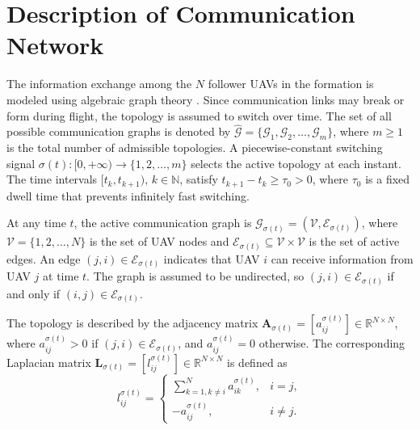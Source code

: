 
\section{Description of Communication Network}
\label{sec5:graph_theory}

The information exchange among the $N$ follower UAVs in the formation is modeled
using algebraic graph theory \cite{graphtheory1, graphtheory2}. Since communication
links may break or form during flight, the topology is assumed to switch over time.
The set of all possible communication graphs is denoted by
$\hat{\mathcal{G}} = \{\mathcal{G}_1, \mathcal{G}_2, \ldots, \mathcal{G}_m\}$, where
$m \geq 1$ is the total number of admissible topologies. A piecewise-constant
switching signal $\sigma(t): [0, +\infty) \rightarrow \{1, 2, \ldots, m\}$ selects the
active topology at each instant. The time intervals $[t_k, t_{k+1})$, $k \in \mathbb{N}$,
satisfy $t_{k+1} - t_k \geq \tau_0 > 0$, where $\tau_0$ is a fixed dwell time that
prevents infinitely fast switching.

At any time $t$, the active communication graph is
$\mathcal{G}_{\sigma(t)} = (\mathcal{V}, \mathcal{E}_{\sigma(t)})$, where
$\mathcal{V} = \{1, 2, \ldots, N\}$ is the set of UAV nodes and
$\mathcal{E}_{\sigma(t)} \subseteq \mathcal{V} \times \mathcal{V}$ is the set of active
edges. An edge $(j, i) \in \mathcal{E}_{\sigma(t)}$ indicates that UAV $i$ can receive
information from UAV $j$ at time $t$. The graph is assumed to be undirected, so
$(j, i) \in \mathcal{E}_{\sigma(t)}$ if and only if $(i, j) \in \mathcal{E}_{\sigma(t)}$.

The topology is described by the adjacency matrix
$\mathbf{A}_{\sigma(t)} = [a_{ij}^{\sigma(t)}] \in \mathbb{R}^{N \times N}$, where
$a_{ij}^{\sigma(t)} > 0$ if $(j, i) \in \mathcal{E}_{\sigma(t)}$, and
$a_{ij}^{\sigma(t)} = 0$ otherwise. The corresponding Laplacian matrix
$\mathbf{L}_{\sigma(t)} = [l_{ij}^{\sigma(t)}] \in \mathbb{R}^{N \times N}$ is defined as
\begin{equation}
    l_{ij}^{\sigma(t)} =
    \begin{cases}
        \displaystyle\sum_{k=1, k \neq i}^{N} a_{ik}^{\sigma(t)}, & i = j, \\[6pt]
        -a_{ij}^{\sigma(t)}, & i \neq j.
    \end{cases}
\end{equation}

